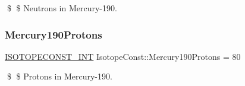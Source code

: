 \$ \$ Neutrons in Mercury-\/190. \mbox{\label{group___isotope_const-_mercury-_hg190_gad252ad6e9ee72b03b8114a608e2ef9f5}} 
\subsubsection{\texorpdfstring{Mercury190\+Protons}{Mercury190Protons}}
{\footnotesize\ttfamily \mbox{\hyperlink{group___isotope_const-_macros_ga5f18360b3e99483a35c32d789e62621c}{I\+S\+O\+T\+O\+P\+E\+C\+O\+N\+S\+T\+\_\+\+I\+NT}} Isotope\+Const\+::\+Mercury190\+Protons = 80}

\$ \$ Protons in Mercury-\/190. 